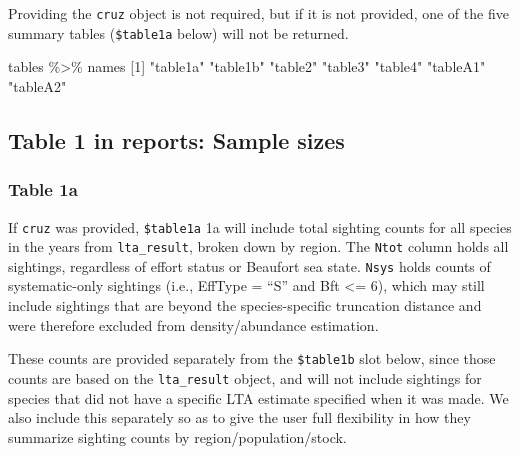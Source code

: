 \documentclass[
]{book}
\newenvironment{Shaded}{\begin{snugshade}}{\end{snugshade}}
\newcommand{\AttributeTok}[1]{\textcolor[rgb]{0.77,0.63,0.00}{#1}}
\newcommand{\DecValTok}[1]{\textcolor[rgb]{0.00,0.00,0.81}{#1}}
\newcommand{\FunctionTok}[1]{\textcolor[rgb]{0.00,0.00,0.00}{#1}}
\newcommand{\NormalTok}[1]{#1}
\newcommand{\SpecialCharTok}[1]{\textcolor[rgb]{0.00,0.00,0.00}{#1}}
\newcommand{\StringTok}[1]{\textcolor[rgb]{0.31,0.60,0.02}{#1}}
\begin{document}
Providing the \texttt{cruz} object is not required, but if it is not provided, one of the five summary tables (\texttt{\$table1a} below) will not be returned.

\begin{Shaded}
\begin{Highlighting}[]
\NormalTok{tables }\SpecialCharTok{\%\textgreater{}\%}\NormalTok{ names}
\NormalTok{[}\DecValTok{1}\NormalTok{] }\StringTok{"table1a"} \StringTok{"table1b"} \StringTok{"table2"}  \StringTok{"table3"}  \StringTok{"table4"}  \StringTok{"tableA1"} \StringTok{"tableA2"}
\end{Highlighting}
\end{Shaded}

\hypertarget{table-1-in-reports-sample-sizes}{%
\subsection*{Table 1 in reports: Sample sizes}\label{table-1-in-reports-sample-sizes}}

\hypertarget{table-1a}{%
\subsubsection*{Table 1a}\label{table-1a}}

If \texttt{cruz} was provided, \texttt{\$table1a} 1a will include total sighting counts for all species in the years from \texttt{lta\_result}, broken down by region. The \texttt{Ntot} column holds all sightings, regardless of effort status or Beaufort sea state. \texttt{Nsys} holds counts of systematic-only sightings (i.e., EffType = ``S'' and Bft \textless= 6), which may still include sightings that are beyond the species-specific truncation distance and were therefore excluded from density/abundance estimation.

These counts are provided separately from the \texttt{\$table1b} slot below, since those counts are based on the \texttt{lta\_result} object, and will not include sightings for species that did not have a specific LTA estimate specified when it was made. We also include this separately so as to give the user full flexibility in how they summarize sighting counts by region/population/stock.

\begin{Shaded}
\end{Shaded}
\end{document}
